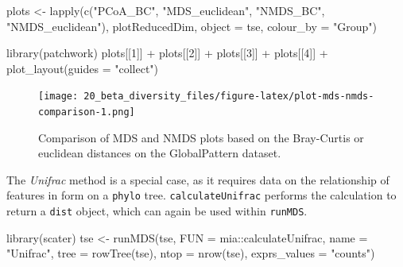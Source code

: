 \documentclass[
]{book}
\newenvironment{Shaded}{\begin{snugshade}}{\end{snugshade}}
\newcommand{\AttributeTok}[1]{\textcolor[rgb]{0.77,0.63,0.00}{#1}}
\newcommand{\DecValTok}[1]{\textcolor[rgb]{0.00,0.00,0.81}{#1}}
\newcommand{\FunctionTok}[1]{\textcolor[rgb]{0.00,0.00,0.00}{#1}}
\newcommand{\NormalTok}[1]{#1}
\newcommand{\OtherTok}[1]{\textcolor[rgb]{0.56,0.35,0.01}{#1}}
\newcommand{\SpecialCharTok}[1]{\textcolor[rgb]{0.00,0.00,0.00}{#1}}
\newcommand{\StringTok}[1]{\textcolor[rgb]{0.31,0.60,0.02}{#1}}
\begin{document}
\begin{Shaded}
\begin{Highlighting}[]
\NormalTok{plots }\OtherTok{\textless{}{-}} \FunctionTok{lapply}\NormalTok{(}\FunctionTok{c}\NormalTok{(}\StringTok{"PCoA\_BC"}\NormalTok{, }\StringTok{"MDS\_euclidean"}\NormalTok{, }\StringTok{"NMDS\_BC"}\NormalTok{, }\StringTok{"NMDS\_euclidean"}\NormalTok{),}
\NormalTok{                plotReducedDim,}
                \AttributeTok{object =}\NormalTok{ tse,}
                \AttributeTok{colour\_by =} \StringTok{"Group"}\NormalTok{)}

\FunctionTok{library}\NormalTok{(patchwork)}
\NormalTok{plots[[}\DecValTok{1}\NormalTok{]] }\SpecialCharTok{+}\NormalTok{ plots[[}\DecValTok{2}\NormalTok{]] }\SpecialCharTok{+}\NormalTok{ plots[[}\DecValTok{3}\NormalTok{]] }\SpecialCharTok{+}\NormalTok{ plots[[}\DecValTok{4}\NormalTok{]] }\SpecialCharTok{+}
  \FunctionTok{plot\_layout}\NormalTok{(}\AttributeTok{guides =} \StringTok{"collect"}\NormalTok{)}
\end{Highlighting}
\end{Shaded}

\begin{figure}
\centering
\texttt{[image: 20\_beta\_diversity\_files/figure-latex/plot-mds-nmds-comparison-1.png]}
\caption{\label{fig:plot-mds-nmds-comparison}Comparison of MDS and NMDS plots based on the Bray-Curtis or euclidean distances on the GlobalPattern dataset.}
\end{figure}

The \emph{Unifrac} method is a special case, as it requires data on the
relationship of features in form on a \texttt{phylo} tree. \texttt{calculateUnifrac}
performs the calculation to return a \texttt{dist} object, which can again be
used within \texttt{runMDS}.

\begin{Shaded}
\begin{Highlighting}[]
\FunctionTok{library}\NormalTok{(scater)}
\NormalTok{tse }\OtherTok{\textless{}{-}} \FunctionTok{runMDS}\NormalTok{(tse, }\AttributeTok{FUN =}\NormalTok{ mia}\SpecialCharTok{::}\NormalTok{calculateUnifrac, }\AttributeTok{name =} \StringTok{"Unifrac"}\NormalTok{,}
              \AttributeTok{tree =} \FunctionTok{rowTree}\NormalTok{(tse),}
              \AttributeTok{ntop =} \FunctionTok{nrow}\NormalTok{(tse),}
             \AttributeTok{exprs\_values =} \StringTok{"counts"}\NormalTok{)}
\end{Highlighting}
\end{Shaded}
\end{document}
